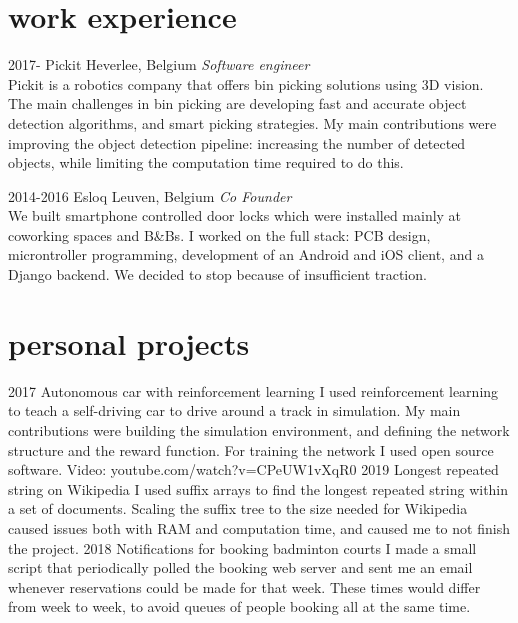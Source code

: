 \documentclass[]{twentysecondcv}
\begin{document}
\section{work experience}
\begin{twenty}
  \twentyitem
    {2017-}
    {Pickit}
    {Heverlee, Belgium}
    {\textit{Software engineer}\\Pickit is a robotics company that offers bin picking solutions using 3D vision. The main challenges in bin picking are developing fast and accurate object detection algorithms, and smart picking strategies. My main contributions were improving the object detection pipeline: increasing the number of detected objects, while limiting the computation time required to do this.}

  \twentyitem
    {2014-2016}
    {Esloq}
    {Leuven, Belgium}
    {\textit{Co Founder}\\We built smartphone controlled door locks which were installed mainly at coworking spaces and B\&Bs. I worked on the full stack: PCB design, microntroller programming, development of an Android and iOS client, and a Django backend. We decided to stop because of insufficient traction.}
\end{twenty}

\section{personal projects}
\begin{twenty}
  \twentyitem
    {2017}
    {Autonomous car with reinforcement learning}
    {}
    {I used reinforcement learning to teach a self-driving car to drive around a track in simulation. My main contributions were building the simulation environment, and defining the network structure and the reward function. For training the network I used open source software. Video: youtube.com/watch?v=CPeUW1vXqR0}
  \twentyitem
    {2019}
    {Longest repeated string on Wikipedia}
    {}
    {I used suffix arrays to find the longest repeated string within a set of documents. Scaling the suffix tree to the size needed for Wikipedia caused issues both with RAM and computation time, and caused me to not finish the project.}
  \twentyitem
    {2018}
    {Notifications for booking badminton courts}
    {}
    {I made a small script that periodically polled the booking web server and sent me an email whenever reservations could be made for that week. These times would differ from week to week, to avoid queues of people booking all at the same time.}
\end{twenty}
\end{document}
